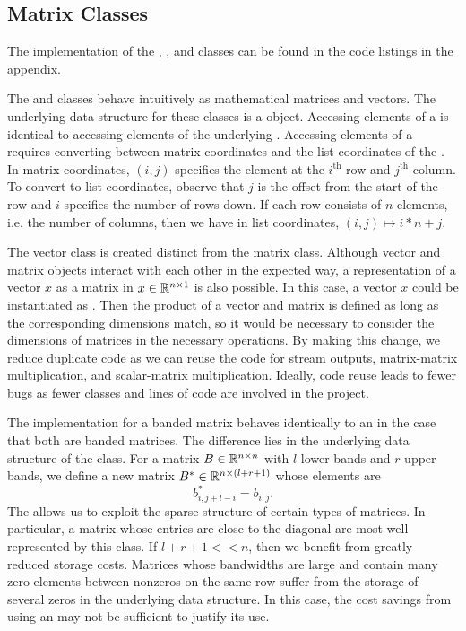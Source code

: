 \subsection{Matrix Classes}

The implementation of the , , and  classes can be found in the code listings in the appendix.

The  and  classes behave intuitively as mathematical matrices and vectors. 
The underlying data structure for these classes is a  object.
Accessing elements of a  is identical to accessing elements of the underlying .
Accessing elements of a  requires converting between matrix coordinates and the list coordinates of the .
In matrix coordinates, $(i,j)$ specifies the element at the $i^\mathrm{th}$ row and $j^\mathrm{th}$ column.
To convert to list coordinates, observe that $j$ is the offset from the start of the row and $i$ specifies the number of rows down.
If each row consists of $n$ elements, i.e. the number of columns, then we have in list coordinates, $(i,j) \mapsto i*n + j$.


The vector class is created distinct from the matrix class.
Although vector and matrix objects interact with each other in the expected way, a representation of a vector $x$ as a matrix in $x\in\mathbb{R}^{n\times 1}$ is also possible.
In this case, a vector $x$ could be instantiated as .
Then the product of a vector and matrix is defined as long as the corresponding dimensions match, so it would be necessary to consider the dimensions of matrices in the necessary operations.
By making this change, we reduce duplicate code as we can reuse the code for stream outputs, matrix-matrix multiplication, and scalar-matrix multiplication.
Ideally, code reuse leads to fewer bugs as fewer classes and lines of code are involved in the project.


The  implementation for a banded matrix behaves identically to an  in the case that both are banded matrices.
The difference lies in the underlying data structure of the class.
For a matrix $B\in\mathbb{R}^{n\times n}$ with $l$ lower bands and $r$ upper bands, we define a new matrix $B^*\in\mathbb{R}^{n \times (l+r+1)}$ whose elements are
\[
    b^*_{i,j+l-i} = b_{i,j}.
\]
The  allows us to exploit the sparse structure of certain types of matrices.
In particular, a matrix whose entries are close to the diagonal are most well represented by this class. 
If $l+r+1 << n$, then we benefit from greatly reduced storage costs.
Matrices whose bandwidths are large and contain many zero elements between nonzeros on the same row suffer from the storage of several zeros in the underlying data structure.
In this case, the cost savings from using an  may not be sufficient to justify its use.

